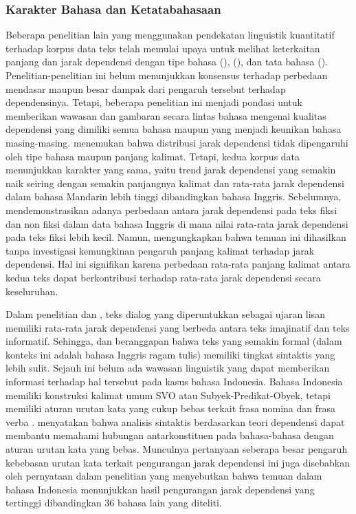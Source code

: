\subsubsection{Karakter Bahasa dan Ketatabahasaan}
Beberapa penelitian lain yang menggunakan pendekatan linguistik kuantitatif terhadap korpus data teks telah memulai upaya untuk melihat keterkaitan panjang dan jarak dependensi dengan tipe bahasa (\citealp{hiranuma1999syntactic, eppler2005syntax, liu2012quantitative}), (\citealp{oya2011syntactic, ferrer2014risks, jiang2015effects}), dan tata bahasa (\citealp{liu2008dependency, gildea2010grammars}). Penelitian-penelitian ini belum menunjukkan konsensus terhadap perbedaan mendasar maupun besar dampak dari pengaruh tersebut terhadap dependensinya. Tetapi, beberapa penelitian ini menjadi pondasi untuk memberikan wawasan dan gambaran secara lintas bahasa mengenai kualitas dependensi yang dimiliki semua bahasa maupun yang menjadi keunikan bahasa masing-masing. \cite{jiang2015effects} menemukan bahwa distribusi jarak dependensi tidak dipengaruhi oleh tipe bahasa maupun panjang kalimat. Tetapi, kedua korpus data menunjukkan karakter yang sama, yaitu trend jarak dependensi yang semakin naik seiring dengan semakin panjangnya kalimat dan rata-rata jarak dependensi dalam bahasa Mandarin lebih tinggi dibandingkan bahasa Inggris. Sebelumnya, \cite{oya2013degree} mendemonstrasikan adanya perbedaan antara jarak dependensi pada teks fiksi dan non fiksi dalam data bahasa Inggris di mana nilai rata-rata jarak dependensi pada teks fiksi lebih kecil. Namun, \cite{wang2017effects} mengungkapkan bahwa temuan ini dihasilkan tanpa investigasi kemungkinan pengaruh panjang kalimat terhadap jarak dependensi. Hal ini signifikan karena perbedaan rata-rata panjang kalimat antara kedua teks dapat berkontribusi terhadap rata-rata jarak dependensi secara keseluruhan.

Dalam penelitian \cite{hiranuma1999syntactic} dan \cite{liu2009chinese}, teks dialog yang diperuntukkan sebagai ujaran lisan memiliki rata-rata jarak dependensi yang berbeda antara teks imajinatif dan teks informatif. Sehingga, \cite{hiranuma1999syntactic} dan \cite{liu2009chinese} beranggapan bahwa teks yang semakin formal (dalam konteks ini adalah bahasa Inggris ragam tulis) memiliki tingkat sintaktis yang lebih sulit. Sejauh ini belum ada wawasan linguistik yang dapat memberikan informasi terhadap hal tersebut pada kasus bahasa Indonesia. Bahasa Indonesia memiliki konstruksi kalimat umum  SVO atau Subyek-Predikat-Obyek, tetapi memiliki aturan urutan kata yang cukup bebas terkait frasa nomina dan frasa verba \citep{irmawati2015dependency}. \cite{kubler2009dependency} menyatakan bahwa analisis sintaktis berdasarkan teori dependensi dapat membantu memahami hubungan antarkonstituen pada bahasa-bahasa dengan aturan urutan kata yang bebas. Munculnya pertanyaan seberapa besar pengaruh kebebasan urutan kata terkait pengurangan jarak dependensi ini juga disebabkan oleh pernyataan dalam penelitian \cite{futrell2015large} yang menyebutkan bahwa temuan dalam bahasa Indonesia menunjukkan hasil pengurangan jarak dependensi yang tertinggi dibandingkan 36 bahasa lain yang diteliti.

